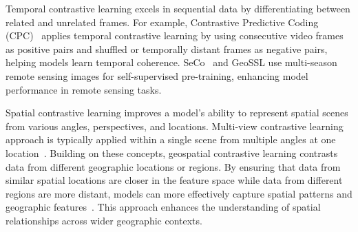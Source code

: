 Temporal contrastive learning excels in sequential data by differentiating between related and unrelated frames. For example, Contrastive Predictive Coding (CPC)~\citep{oord2019representation} applies temporal contrastive learning by using consecutive video frames as positive pairs and shuffled or temporally distant frames as negative pairs, helping models learn temporal coherence. 
SeCo~\citep{manas2021seasonal} and GeoSSL \citep{ayush2021geographyaware} use multi-season remote sensing images for self-supervised pre-training, enhancing model performance in remote sensing tasks.


Spatial contrastive learning improves a model's ability to represent spatial scenes from various angles, perspectives, and locations. Multi-view contrastive learning approach is typically applied within a single scene from multiple angles at one location~\citep{tian2020contrastive}.
Building on these concepts, geospatial contrastive learning contrasts data from different geographic locations or regions. By ensuring that data from similar spatial locations are closer in the feature space while data from different regions are more distant, models can more effectively capture spatial patterns and geographic features~\citep{deuser2023sample4geo,klemmer2024satclip,mai2023csp,guo2024spatialscene2vec}. This approach enhances the understanding of spatial relationships across wider geographic contexts.

